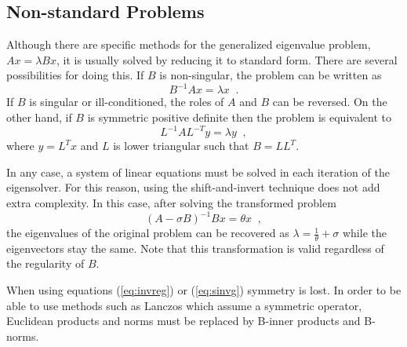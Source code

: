 \subsection{Non-standard Problems}
\label{sec:nonstd}

	Although there are specific methods for the generalized eigenvalue problem, $Ax=\lambda Bx$, it is usually solved by reducing it to standard form. There are several possibilities for doing this. If $B$ is non-singular, the problem can be written as
\begin{equation}
\label{eq:invreg}
B^{-1}Ax=\lambda x\;\;.
\end{equation}
If $B$ is singular or ill-conditioned, the roles of $A$ and $B$ can be reversed. On the other hand, if $B$ is symmetric positive definite then the problem is equivalent to
\begin{equation}
L^{-1}A L^{-T}y=\lambda y\;\;,
\end{equation}
where $y=L^Tx$ and $L$ is lower triangular such that $B=LL^T$. 

	In any case, a system of linear equations must be solved in each iteration of the eigensolver. For this reason, using the shift-and-invert technique does not add extra complexity. In this case, after solving the transformed problem
\begin{equation}
\label{eq:sinvg}
(A-\sigma B)^{-1}Bx=\theta x\;\;,
\end{equation}
the eigenvalues of the original problem can be recovered as $\lambda=\frac{1}{\theta}+\sigma$ while the eigenvectors stay the same. Note that this transformation is valid regardless of the regularity of $B$.

	When using equations (\ref{eq:invreg}) or (\ref{eq:sinvg}) symmetry is lost. In order to be able to use methods such as Lanczos which assume a symmetric operator, Euclidean products and norms must be replaced by B-inner products and B-norms.

